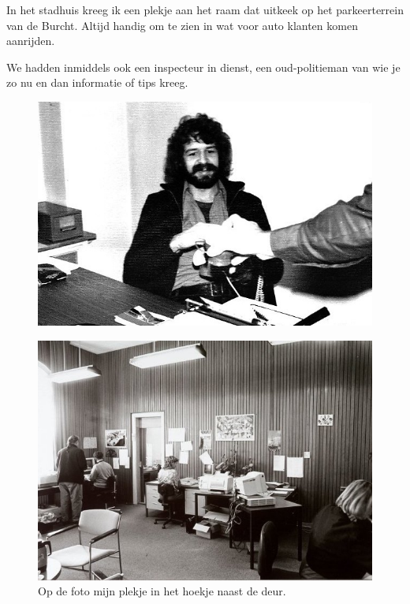 \documentclass[12pt,twoside, openright]{memoir}
\begin{document}
In het stadhuis kreeg ik een plekje aan het raam dat uitkeek op het parkeerterrein van de Burcht. Altijd handig om te zien in wat voor auto klanten komen aanrijden. 

We hadden inmiddels ook een inspecteur in dienst, een oud-politieman van wie je zo nu en dan informatie of tips kreeg. 

\begin{figure}
\centering
\includegraphics[width=\textwidth]{img/ch42/IMG_0001}
\end{figure}

\begin{figure}
\centering
\includegraphics[width=\textwidth]{img/253-2}
\caption*{\footnotesize Op de foto mijn plekje in het hoekje naast de deur.}
\end{figure}
\end{document}
